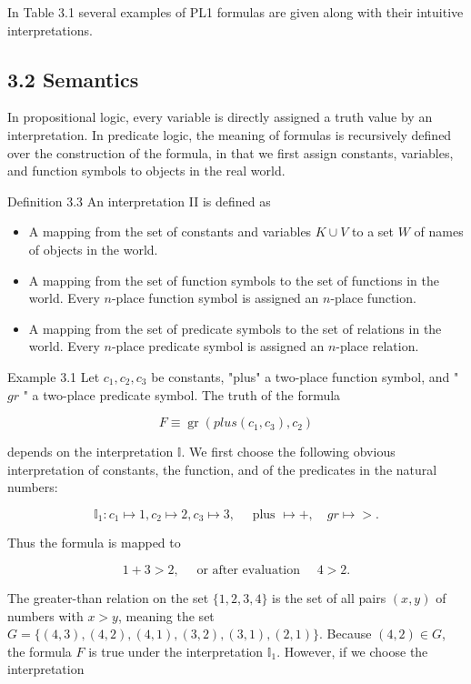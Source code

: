 \documentclass[10pt]{article}
\begin{document}
In Table 3.1 several examples of PL1 formulas are given along with their intuitive interpretations.

\subsection*{3.2 Semantics}
In propositional logic, every variable is directly assigned a truth value by an interpretation. In predicate logic, the meaning of formulas is recursively defined over the construction of the formula, in that we first assign constants, variables, and function symbols to objects in the real world.

Definition 3.3 An interpretation II is defined as

\begin{itemize}
  \item A mapping from the set of constants and variables $K \cup V$ to a set $W$ of names of objects in the world.
  \item A mapping from the set of function symbols to the set of functions in the world. Every $n$-place function symbol is assigned an $n$-place function.
  \item A mapping from the set of predicate symbols to the set of relations in the world. Every $n$-place predicate symbol is assigned an $n$-place relation.
\end{itemize}

Example 3.1 Let $c_{1}, c_{2}, c_{3}$ be constants, "plus" a two-place function symbol, and " $g r$ " a two-place predicate symbol. The truth of the formula

$$
F \equiv \operatorname{gr}\left(p l u s\left(c_{1}, c_{3}\right), c_{2}\right)
$$

depends on the interpretation $\mathbb{I}$. We first choose the following obvious interpretation of constants, the function, and of the predicates in the natural numbers:

$$
\mathbb{I}_{1}: c_{1} \mapsto 1, c_{2} \mapsto 2, c_{3} \mapsto 3, \quad \text { plus } \mapsto+, \quad g r \mapsto>.
$$

Thus the formula is mapped to

$$
1+3>2, \quad \text { or after evaluation } \quad 4>2 .
$$

The greater-than relation on the set $\{1,2,3,4\}$ is the set of all pairs $(x, y)$ of numbers with $x>y$, meaning the set $G=\{(4,3),(4,2),(4,1),(3,2),(3,1),(2,1)\}$. Because $(4,2) \in G$, the formula $F$ is true under the interpretation $\mathbb{I}_{1}$. However, if we choose the interpretation
\end{document}
